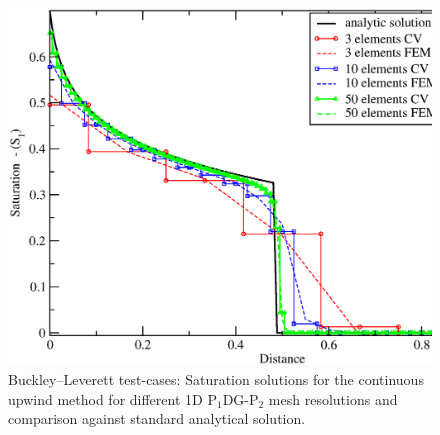

\begin{figure}[h]
\begin{center}
\includegraphics[width=1.\textwidth]{diagrams/bl-exact-meth-upwind.eps}
\end{center}
\caption{Buckley--Leverett test-cases: Saturation solutions for the continuous upwind method for different 1D P$_{1}$DG-P$_{2}$ mesh  resolutions and comparison against standard analytical solution.
\label{bl-exact-meth-upwind}}
\end{figure}

